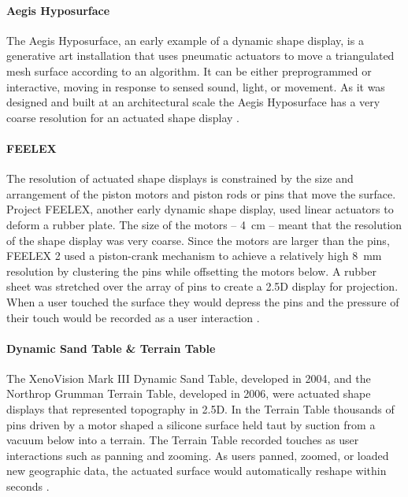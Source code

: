 \documentclass{article}
\begin{document}
\paragraph{Aegis Hyposurface}
The Aegis Hyposurface, an early example of a dynamic shape display,
is a generative art installation that uses pneumatic actuators to move a triangulated mesh surface
according to an algorithm.
It can be either preprogrammed or interactive,
moving in response to sensed sound, light, or movement.
As it was designed and built at an architectural scale the Aegis Hyposurface has a very coarse resolution for an actuated shape display \citep{Goulthorpe2000}.   

\paragraph{FEELEX}
The resolution of actuated shape displays is constrained by the size and arrangement of the piston motors and piston rods or pins that move the surface. Project FEELEX, another early dynamic shape display, used linear actuators to deform a rubber plate. The size of the motors -- 4~cm -- meant that the resolution of the shape display was very coarse.  
Since the motors are larger than the pins, FEELEX 2 used a piston-crank mechanism to achieve a relatively high 8~mm resolution by clustering the pins while offsetting the motors below. 
A rubber sheet was stretched over the array of pins to create a 2.5D display for projection.  
When a user touched the surface they would depress the pins and the pressure of their touch would be recorded as a user interaction \citep{Iwata2001}.  

\paragraph{Dynamic Sand Table \& Terrain Table}
The XenoVision Mark III Dynamic Sand Table, developed in 2004, %
and the Northrop Grumman Terrain Table, developed in 2006, were actuated shape displays that represented topography in 2.5D. 
In the Terrain Table thousands of pins driven by a motor shaped a silicone surface held taut by suction from a vacuum below into a terrain. 
The Terrain Table recorded touches as user interactions such as panning and zooming.
As users panned, zoomed, or loaded new geographic data, the actuated surface would automatically reshape within seconds \citep{petrie2006}.  
\end{document}
